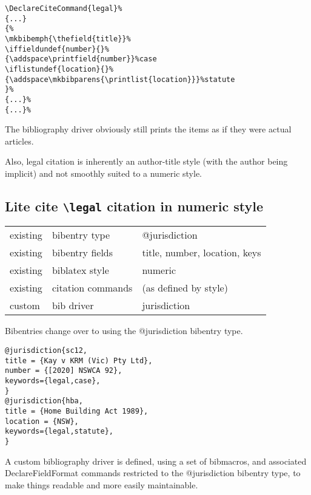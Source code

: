 \documentclass[12pt]{article}
\newcommand\goodoh{{\large\ftmark 🗸}}
\newcommand\cmd[1]{\texttt{\textbackslash #1}}
\begin{document}
\begin{verbatim}
\DeclareCiteCommand{legal}%
{...} 
{%
\mkbibemph{\thefield{title}}%
\iffieldundef{number}{}%
{\addspace\printfield{number}}%case
\iflistundef{location}{}%
{\addspace\mkbibparens{\printlist{location}}}%statute
}%
{...}%
{...}%
\end{verbatim}

The bibliography driver obviously still prints the items as if they were actual articles.

Also, legal citation is inherently an author-title style (with the author being implicit) and not smoothly suited to a numeric style.






\subsection{Lite cite \cmd{legal} citation in numeric style}

\begin{tabular}{lll}
existing   &    bibentry type               & \ttfamily @jurisdiction \\
existing   &    bibentry fields              & \ttfamily title, number, location, keys \\
existing   &    biblatex style                & \ttfamily numeric \\
existing   &    citation commands          & (as defined by style) \\
custom    &    bib driver                    & \ttfamily jurisdiction \\
\end{tabular}
\bigskip

Bibentries change over to using the @jurisdiction bibentry type.

\begin{verbatim}
@jurisdiction{sc12,
title = {Kay v KRM (Vic) Pty Ltd},
number = {[2020] NSWCA 92},
keywords={legal,case},
}
@jurisdiction{hba,
title = {Home Building Act 1989},
location = {NSW},
keywords={legal,statute},
}
\end{verbatim}

A custom bibliography driver is defined, using a set of bibmacros, and associated DeclareFieldFormat commands restricted to the @jurisdiction bibentry type, to make things readable and more easily maintainable.
\end{document}
